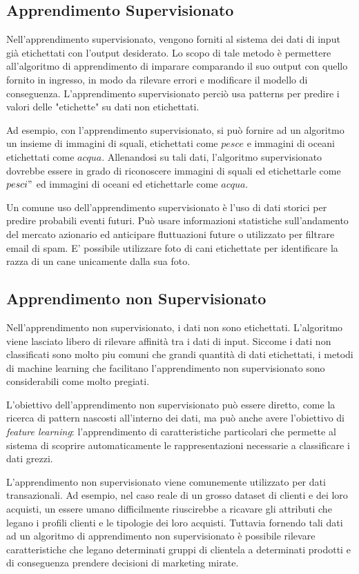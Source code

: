 \subsection{Apprendimento Supervisionato}
Nell'apprendimento supervisionato, vengono forniti al sistema dei dati di input già etichettati con l'output desiderato. Lo scopo di tale metodo è permettere all'algoritmo di apprendimento di imparare comparando il suo output con quello fornito in ingresso, in modo da rilevare errori e modificare il modello di conseguenza. L'apprendimento supervisionato perciò usa patterns per predire i valori delle "etichette" su dati non etichettati.

Ad esempio, con l'apprendimento supervisionato, si può fornire ad un algoritmo un insieme di immagini di squali, etichettati come $pesce$ e immagini di oceani etichettati come $acqua$. Allenandosi su tali dati, l'algoritmo supervisionato dovrebbe essere in grado di riconoscere immagini di squali ed etichettarle come $pesci"$ ed immagini di oceani ed etichettarle come $acqua$.

Un comune uso dell'apprendimento supervisionato è l'uso di dati storici per predire probabili eventi futuri. Può usare informazioni statistiche sull'andamento del mercato azionario ed anticipare fluttuazioni future o utilizzato per filtrare email di spam. E' possibile utilizzare foto di cani etichettate per identificare la razza di un cane unicamente dalla sua foto.

\subsection{Apprendimento non Supervisionato}
Nell'apprendimento non supervisionato, i dati non sono etichettati. L'algoritmo viene lasciato libero di rilevare affinità tra i dati di input. Siccome i dati non classificati sono molto piu comuni che grandi quantità di dati etichettati, i metodi di machine learning che facilitano l'apprendimento non supervisionato sono considerabili come molto pregiati.

L'obiettivo dell'apprendimento non supervisionato può essere diretto, come la ricerca di pattern nascosti all'interno dei dati, ma può anche avere l'obiettivo di \textit{feature learning}: l'apprendimento di caratteristiche particolari che permette al sistema di scoprire automaticamente le rappresentazioni necessarie a classificare i dati grezzi.

L'apprendimento non supervisionato viene comunemente utilizzato per dati transazionali. Ad esempio, nel caso reale di un grosso dataset di clienti e dei loro acquisti, un essere umano difficilmente riuscirebbe a ricavare gli attributi che legano i profili clienti e le tipologie dei loro acquisti. Tuttavia fornendo tali dati ad un algoritmo di  apprendimento non supervisionato è possibile rilevare caratteristiche che legano determinati gruppi di clientela a determinati prodotti e di conseguenza prendere decisioni di marketing mirate.


